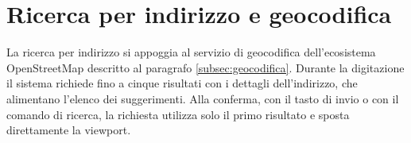 %
%

\section{Ricerca per indirizzo e geocodifica}\label{subsec:impl-ricerca}

La ricerca per indirizzo si appoggia al servizio di geocodifica dell'ecosistema OpenStreetMap descritto al
paragrafo \ref{subsec:geocodifica}. %
Durante la digitazione il sistema richiede fino a cinque risultati con i dettagli dell'indirizzo, che alimentano l'elenco
dei suggerimenti.
Alla conferma, con il tasto di invio o con il comando di ricerca, la richiesta utilizza
solo il primo risultato e sposta direttamente la viewport.

